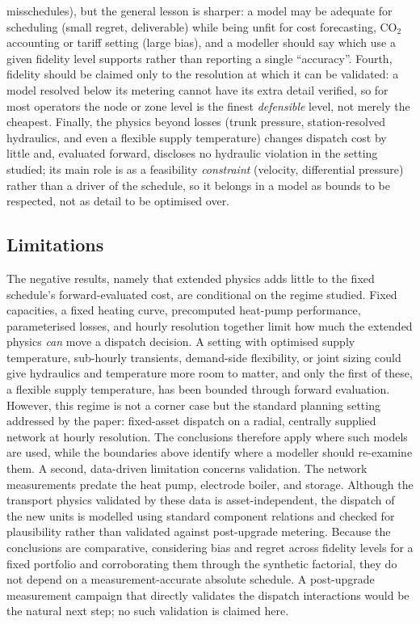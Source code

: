 \documentclass[a4paper,fleqn]{cas-sc}
\newcommand{\new}[1]{\textcolor[HTML]{1A5FB4}{#1}}   %
\newcommand{\new}[1]{#1}
\begin{document}
misschedules), but the general lesson is sharper: a model may be adequate for scheduling
(small regret, deliverable) while being unfit for cost forecasting, CO$_2$ accounting or tariff
setting (large bias), and a modeller should say which use a given fidelity level supports rather
than reporting a single ``accuracy''. Fourth, fidelity should be claimed only to the resolution
at which it can be validated: a model resolved below its metering cannot have its extra detail
verified, so for most operators the node or zone level is the finest \emph{defensible} level,
not merely the cheapest. Finally, the physics beyond losses (trunk pressure, station-resolved
hydraulics, and even a flexible supply temperature) changes dispatch cost by little and,
evaluated forward, discloses no hydraulic violation in the setting studied; its main role is as a feasibility
\emph{constraint} (velocity, differential pressure) rather than a driver of the schedule, so it
belongs in a model as bounds to be respected, not as detail to be optimised over.


\subsection{Limitations}
The negative results, namely that extended physics adds little to the fixed schedule's
forward-evaluated cost, are conditional on the regime studied. Fixed capacities, a fixed
heating curve, precomputed heat-pump performance, parameterised losses, and hourly resolution
together limit how much the extended physics \emph{can} move a dispatch decision. A setting with
optimised supply temperature, sub-hourly transients, demand-side flexibility, or joint sizing
could give hydraulics and temperature more room to matter, and only the first of these, a
flexible supply temperature, has been bounded through forward evaluation. However, this regime
is not a corner case but the standard planning setting addressed by the paper: fixed-asset
dispatch on a radial, centrally supplied network at hourly resolution. The conclusions
therefore apply where such models are used, while the boundaries above identify where a
modeller should re-examine them. A second, data-driven limitation concerns validation. The
network measurements predate the heat pump, electrode boiler, and storage. Although the
transport physics validated by these data is asset-independent, the dispatch of the new units
is modelled using standard component relations and checked for plausibility rather than
validated against post-upgrade metering. Because the conclusions are comparative, considering
bias and regret across fidelity levels for a fixed portfolio and corroborating them through the
synthetic factorial, they do not depend on a measurement-accurate absolute schedule. A
post-upgrade measurement campaign that directly validates the dispatch interactions would be
the natural next step; no such validation is claimed here.
\new{}
\end{document}
